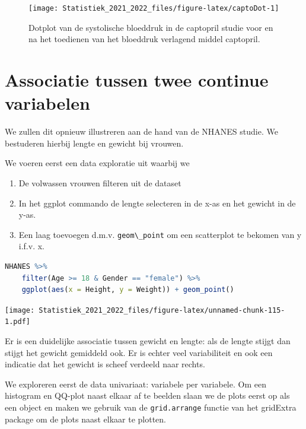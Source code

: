 \documentclass[
  12pt,dutch,coursenotes]{book}
\newcommand{\passthrough}[1]{#1}
\providecommand{\tightlist}{%
  \setlength{\itemsep}{0pt}\setlength{\parskip}{0pt}}
\theoremstyle{definition}
\theoremstyle{definition}
\theoremstyle{definition}
\theoremstyle{definition}
\theoremstyle{remark}
\begin{document}
\begin{figure}

{\centering \texttt{[image: Statistiek\_2021\_2022\_files/figure-latex/captoDot-1]} 

}

\caption{Dotplot van de systolische bloeddruk in de captopril studie voor en na het toedienen van het bloeddruk verlagend middel captopril.}\label{fig:captoDot}
\end{figure}

\hypertarget{sec:correlatie}{%
\section{Associatie tussen twee continue variabelen}\label{sec:correlatie}}

We zullen dit opnieuw illustreren aan de hand van de NHANES studie. We bestuderen hierbij lengte en gewicht bij vrouwen.

We voeren eerst een data exploratie uit waarbij we

\begin{enumerate}
\def\labelenumi{\arabic{enumi}.}
\tightlist
\item
  De volwassen vrouwen filteren uit de dataset
\item
  In het ggplot commando de lengte selecteren in de x-as en het gewicht in de y-as.
\item
  Een laag toevoegen d.m.v. \passthrough{\lstinline!geom\_point!} om een scatterplot te bekomen van y i.f.v. x.
\end{enumerate}

\begin{lstlisting}[language=R]
NHANES %>%
    filter(Age >= 18 & Gender == "female") %>%
    ggplot(aes(x = Height, y = Weight)) + geom_point()
\end{lstlisting}

\texttt{[image: Statistiek\_2021\_2022\_files/figure-latex/unnamed-chunk-115-1.pdf]}

Er is een duidelijke associatie tussen gewicht en lengte: als de lengte stijgt dan stijgt het gewicht gemiddeld ook. Er is echter veel variabiliteit en ook een indicatie dat het gewicht is scheef verdeeld naar rechts.

We exploreren eerst de data univariaat: variabele per variabele. Om een histogram en QQ-plot naast elkaar af te beelden slaan we de plots eerst op als een object en maken we gebruik van de \passthrough{\lstinline!grid.arrange!} functie van het gridExtra package om de plots naast elkaar te plotten.
\end{document}
